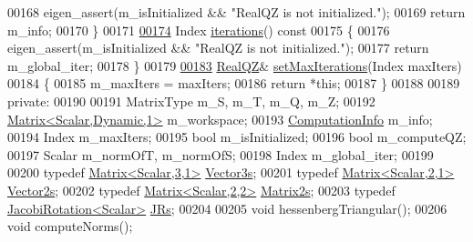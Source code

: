 \begin{DoxyCode}
00168         eigen\_assert(m\_isInitialized && \textcolor{stringliteral}{"RealQZ is not initialized."});
00169         \textcolor{keywordflow}{return} m\_info;
00170       \}
00171 
\hyperlink{group___eigenvalues___module_afbecc6d0ab1de42be9db79428da48ab6}{00174}       Index \hyperlink{group___eigenvalues___module_afbecc6d0ab1de42be9db79428da48ab6}{iterations}()\textcolor{keyword}{ const}
00175 \textcolor{keyword}{      }\{
00176         eigen\_assert(m\_isInitialized && \textcolor{stringliteral}{"RealQZ is not initialized."});
00177         \textcolor{keywordflow}{return} m\_global\_iter;
00178       \}
00179 
\hyperlink{group___eigenvalues___module_a30ae65666b1757e4a2b6a28eaec12226}{00183}       \hyperlink{group___eigenvalues___module_class_eigen_1_1_real_q_z}{RealQZ}& \hyperlink{group___eigenvalues___module_a30ae65666b1757e4a2b6a28eaec12226}{setMaxIterations}(Index maxIters)
00184       \{
00185         m\_maxIters = maxIters;
00186         \textcolor{keywordflow}{return} *\textcolor{keyword}{this};
00187       \}
00188 
00189     \textcolor{keyword}{private}:
00190 
00191       MatrixType m\_S, m\_T, m\_Q, m\_Z;
00192       \hyperlink{group___core___module}{Matrix<Scalar,Dynamic,1>} m\_workspace;
00193       \hyperlink{group__enums_ga85fad7b87587764e5cf6b513a9e0ee5e}{ComputationInfo} m\_info;
00194       Index m\_maxIters;
00195       \textcolor{keywordtype}{bool} m\_isInitialized;
00196       \textcolor{keywordtype}{bool} m\_computeQZ;
00197       Scalar m\_normOfT, m\_normOfS;
00198       Index m\_global\_iter;
00199 
00200       \textcolor{keyword}{typedef} \hyperlink{group___core___module}{Matrix<Scalar,3,1>} \hyperlink{group___core___module}{Vector3s};
00201       \textcolor{keyword}{typedef} \hyperlink{group___core___module_class_eigen_1_1_matrix}{Matrix<Scalar,2,1>} \hyperlink{group___core___module_class_eigen_1_1_matrix}{Vector2s};
00202       \textcolor{keyword}{typedef} \hyperlink{group___core___module_class_eigen_1_1_matrix}{Matrix<Scalar,2,2>} \hyperlink{group___core___module_class_eigen_1_1_matrix}{Matrix2s};
00203       \textcolor{keyword}{typedef} \hyperlink{group___jacobi___module_class_eigen_1_1_jacobi_rotation}{JacobiRotation<Scalar>} \hyperlink{group___jacobi___module_class_eigen_1_1_jacobi_rotation}{JRs};
00204 
00205       \textcolor{keywordtype}{void} hessenbergTriangular();
00206       \textcolor{keywordtype}{void} computeNorms();

\end{DoxyCode}
